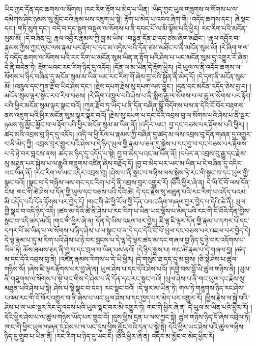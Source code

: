ཡིད་ཀྱང་དོན་དང་ཆགས་ལ་སོགས། །རང་རིག་རྟོག་པ་མེད་པ་ཡིན། །ཡིད་ཀྱང་ཡུལ་གཟུགས་ལ་སོགས་པ་ལ་དམིགས་ཤིང་ཉམས་སུ་མྱོང་བའི་རྣམ་པས་འཇུག་པ་སྟེ། རྟོག་པ་མེད་པ་འབའ་ཞིག་གོ། །འདོད་ཆགས་དང་། ཞེ་སྡང་དང་། གཏི་མུག་དང་། བདེ་བ་དང་སྡུག་བསྔལ་ལ་སོགས་པ་ནི་དབང་པོ་ལ་མི་ལྟོས་པའི་ཕྱིར། རང་རིག་པའི་མངོན་སུམ་མོ། །དེ་བཞིན་དུ། རྣལ་འབྱོར་རྣམས་ཀྱི་བླ་མ་ཡིས། །བསྟན་དོན་ཐ་དད་ཙམ་ཞིག་མཐོང་། །རྣལ་འབྱོར་བ་རྣམས་ཀྱིས་ཀྱང་ལུང་ལས་རྣམ་པར་རྟོག་པ་དང་མ་འདྲེས་པའི་དོན་ཙམ་མཐོང་བ་ནི་མངོན་སུམ་མོ། །རེ་ཞིག་གལ་ཏེ་འདོད་ཆགས་ལ་སོགས་པའི་རང་རིག་པ་མངོན་སུམ་ཡིན་ན་རྟོག་པའི་ཤེས་པ་ཡང་མངོན་སུམ་དུ་འགྱུར་རོ་ཞེན། དེ་ནི་བདེན་ཏེ། རྟོག་པའང་རང་རིག་ཉིད་དུ་འདོད། །དོན་ལ་མ་ཡིན་དེ་རྟོག་ཕྱིར། །དེ་ཡུལ་ལ་ནི་འདོད་ཆགས་ལ་སོགས་པ་ཉིད་བཞིན་དུ་མངོན་སུམ་མ་ཡིན་ཡང་རང་རིག་གོ་ཞེས་བྱ་བའི་སྐྱོན་ནི་མེད་དོ། །དེ་དག་ནི་མངོན་སུམ་མོ། །འཁྲུལ་དང་ཀུན་རྫོབ་ཡིད་ཤེས་དང་། །རྗེས་དཔག་རྗེས་སུ་དཔག་ལས་བྱུང་། །དྲན་དང་མངོན་འདོད་ཅེས་བྱ་བ། །མངོན་སུམ་ལྟར་སྣང་རབ་རིབ་བཅས། །རེ་ཞིག་འཁྲུལ་པའི་ཤེས་པ་ནི་སྨིག་རྒྱུ་ལ་སོགས་པ་ལ་ཆུ་ལ་སོགས་པར་རྟོག་པའི་ཕྱིར་མངོན་སུམ་ལྟར་སྣང་བའོ། །ཀུན་རྫོབ་ཏུ་ཡོད་པ་ནི་དོན་བཞིན་སྒྲོ་འདོགས་པས་ན་དེའི་ངོ་བོར་བརྟགས་ནས་འཇུག་པའི་ཕྱིར་མངོན་སུམ་ལྟར་སྣང་བའོ། །རྗེས་སུ་དཔག་པ་དང་དེའི་འབྲས་བུ་ལ་སོགས་པའི་ཤེས་པ་ནི་སྔར་ཉམས་སུ་མྱོང་མྱོང་བ་ལ་རྟོག་པའི་ཕྱིར་མངོན་སུམ་མ་ཡིན་ནོ། །འདིར་ཡང་། བྱ་དང་བཅས་པར་རྟོགས་པའི་ཕྱིར། །ཚད་མའི་འབྲས་བུ་ཉིད་དུ་འདོད། །འདི་ལ་ཕྱི་རོལ་པ་རྣམས་ཀྱི་བཞིན་དུ་ཚད་མ་ལས་འབྲས་བུ་དོན་གཞན་དུ་འགྱུར་བ་ནི་མེད་ཀྱི། འབྲས་བུར་གྱུར་པའི་ཤེས་པ་དེ་ཉིད་ཡུལ་གྱི་རྣམ་པ་ཅན་དུ་སྐྱེས་པ་དང་བྱ་བ་དང་བཅས་པར་རྟོགས་པ་དེ་ཉེ་བར་བླངས་ནས། ཚད་མ་ཉིད་དུ་འདོད་པ་སྟེ། བྱ་བ་མེད་པའང་མ་ཡིན་ནོ། །དཔེར་ན་འབྲས་བུ་རྒྱུ་དང་རྗེས་སུ་མཐུན་པར་སྐྱེས་པ་ལ་རྒྱུའི་གཟུགས་འཛིན་ཞེས་བརྗོད་དོ། །བྱ་བ་མེད་པར་ཡང་མ་ཡིན་པ་དེ་བཞིན་དུ་འདིར་ཡང་ཡིན་ནོ། །རང་རིག་ལ་ཡང་འདིར་འབྲས་བུ། །ཤེས་པ་ནི་སྣང་བ་གཉིས་ལས་སྐྱེས་ཏེ་རང་གི་སྣང་བ་དང་ཡུལ་གྱི་སྣང་བའོ། །སྣང་བ་དེ་གཉིས་ལས་གང་དང་རིག་པ་དེ་ནི་འབྲས་བུར་འགྱུར་རོ། །ཅིའི་ཕྱིར་ཞེ་ན། དེ་ཡི་ངོ་བོ་ལས་དོན་ངེས། གང་གི་ཚེ་ཤེས་པ་དོན་གྱི་ཡུལ་དང་བཅས་པའི་དེའི་ཚེ། དེ་དང་རྗེས་སུ་མཐུན་པའི་རང་རིག་པ་འདོད་པའམ་མི་འདོད་པའི་དོན་རྟོགས་པར་བྱེད་དོ། །གང་གི་ཚེ་ཕྱི་རོལ་གྱི་དོན་འབའ་ཞིག་གཞལ་བྱར་བྱེད་པ་དེའི་ཚེ་ནི། ཡུལ་གྱི་སྣང་བ་འདི་ཉིད་འདི། །ཚད་མ་དེའི་ཚེ་ནི་ཤེས་པ་རང་རིག་པ་ཡིན་ཡང་ལྟོས་པ་མེད་པའི་རང་གི་ངོ་བོའི་དོན་གྱིས་སྣང་བ་འདི་ཚད་མའོ། །གང་གི་ཕྱིར་ཞེ་ན། དོན་དེ་ཡིས་འཇལ་བར་བྱེད། ཇི་ལྟ་ཇི་ལྟར་དོན་གྱི་རྣམ་པ་དཀར་པོ་དང་དཀར་པོ་མ་ཡིན་པ་ལ་སོགས་པ་ཉིད་ཤེས་པ་ལ་སྣང་བ་ན་དེ་དང་དེའི་ངོ་བོ་ཡུལ་དང་བཅས་པར་འཇལ་བར་བྱེད་དེ། དེ་ལྟ་རྣམ་པ་དུ་མ་རིག་པའི་ཤེས་པ་ཉེ་བར་བླངས་པ་དེ་ལྟ་དེ་ལྟར་ཚད་མ་དང་གཞལ་བྱ་ཉིད་དུ་ཉེ་བར་འདོགས་པ་ཡིན་ཏེ། ཆོས་ཐམས་ཅད་ནི་བྱ་བ་དང་བྲལ་བ་ཡིན་པས་ནའོ། །དེ་ཉིད་སྨྲས་པ། གང་ཚེ་རྣམ་པ་དེ་གཞལ་བྱ། །ཚད་མ་དང་དེའི་འབྲས་བུ་ནི། །འཛིན་རྣམས་རིགས་པ་དེ་ཡི་ཕྱིར། །དེ་གསུམ་ཐ་དད་དུ་མ་བྱས། །ཅི་སྟེ་ཤེས་པ་ཚུལ་གཉིས་སོ། །ཞེས་ཇི་ལྟར་རྟོགས་པར་བྱ་ཞེ་ན། ཡུལ་ཤེས་པ་དང་དེའི་ཤེས་པའོ། །དབྱེ་བས་བློ་ཡི་ཚུལ་གཉིས་ནི། །ཡུལ་ནི་གཟུགས་ལ་སོགས་པ་སྟེ་གང་གིས་དེ་ཤེས་པ་ནི་དོན་དང་རང་སྣང་བའོ། །ཡུལ་ཤེས་པ་ནི་གང་ཡུལ་དང་རྗེས་སུ་མཐུན་པའི་ཤེས་པ་སྟེ། ཤེས་པ་སྟེ་སྣང་བ་དང་། རང་སྣང་བའོ། །དེ་ལྟར་མ་ཡིན་ཏེ། གལ་ཏེ་གཟུགས་ཉིད་རང་ཤེས་པའམ་རང་གི་ངོ་བོར་འགྱུར་བ་ནི་ཞེས་པ་ཡང་ཡུལ་ཤེས་པ་དང་ཁྱད་པར་མེད་པར་འགྱུར་རོ། །ཕྱིས་རྗེས་ལ་སྐྱེ་བའི་ཤེས་པ་ལ་ཡང་སྔར་རིང་དུ་འདས་པའི་ཡུལ་སྣང་བར་མི་འགྱུར་ཏེ། གང་གི་ཕྱིར་ཞེ་ན། དེ་ཡུལ་མ་ཡིན་པའི་ཕྱིར་རོ། །དེའི་ཕྱིར་ཤེས་པ་ལ་ཚུལ་གཉིས་ཡོད་པར་གྲུབ་བོ། །དུས་ཕྱིས་དྲན་པ་ལས་ཀྱང་སྟེ། ཚུལ་གཉིས་ཉིད་དོ་ཞེས་འབྲེལ་ཏོ། །གང་གི་ཕྱིར་ཡུལ་གཞན་དུ་ཤེས་པ་ལ་ཡང་དུས་ཕྱིས་མྱོང་བའི་དྲན་པ་སྐྱེ་སྟེ། དེའི་ཕྱིར་ཡང་ཤེས་པའི་ཚུལ་གཉིས་ཉིད་དུ་གྲུབ་པ་ཡིན་ནོ། །རང་རིག་པ་ཉིད་དུ་ཡང་ངོ། །ཅིའི་ཕྱིར་ཞེ་ན། འདིར་མ་མྱོང་བ་མེད་ཕྱིར་རོ། 